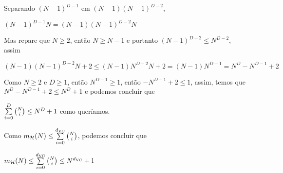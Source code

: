 Separando $(N-1)^{D-1}$ em $(N-1)(N-1)^{D-2}$,

$(N-1)^{D-1} N = (N-1)(N-1)^{D-2}N$

Mas repare que $N \ge 2$, então $N \ge N - 1$ e portanto $(N-1)^{D-2} \le N^{D-2}$, assim

$(N-1)(N-1)^{D-2}N + 2 \le (N-1)N^{D-2}N + 2 = (N-1)N^{D-1} = N^D - N^{D-1} + 2$

Como $N \ge 2$ e $D \ge 1$, então $N^{D-1} \ge 1$, então $-N^{D-1} + 2 \le 1$, assim, temos que
$N^D - N^{D-1} + 2 \le N^D + 1$ e podemos concluir que 

$\sum\limits_{i=0}^D {{N} \choose {i}} \le N^D + 1$
como queríamos.

\vspace{7pt}

Como $m_{\mathcal{H}}(N) \le \sum\limits_{i=0}^{d_{\text{VC}}} {{N} \choose {i}}$, podemos concluir que 

$m_{\mathcal{H}}(N) \le \sum\limits_{i=0}^{d_{\text{VC}}} {{N} \choose {i}} \le N^{d_{\text{VC}}} + 1$\cqd
